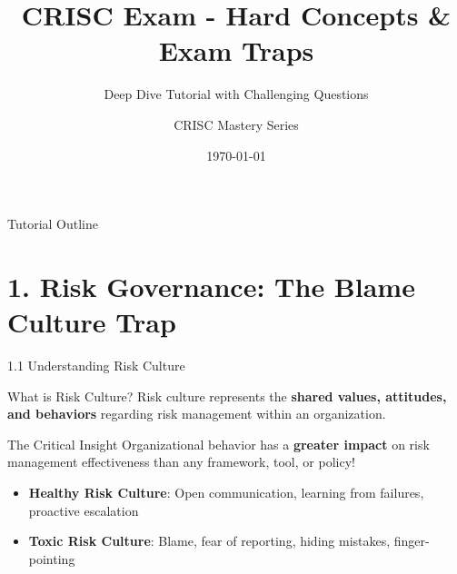 \documentclass{beamer}
\title{CRISC Exam - Hard Concepts \& Exam Traps}
\subtitle{Deep Dive Tutorial with Challenging Questions}
\author{CRISC Mastery Series}
\date{\today}
\begin{document}
	
	\begin{frame}
		\titlepage
	\end{frame}
	
	\begin{frame}{Tutorial Outline}
		\tableofcontents
	\end{frame}
	
	\section{1. Risk Governance: The Blame Culture Trap}
	
	\begin{frame}{1.1 Understanding Risk Culture}
		\begin{block}{What is Risk Culture?}
			Risk culture represents the \textbf{shared values, attitudes, and behaviors} regarding risk management within an organization.
		\end{block}
		
		\begin{alertblock}{The Critical Insight}
			Organizational behavior has a \textbf{greater impact} on risk management effectiveness than any framework, tool, or policy!
		\end{alertblock}
		
		\begin{itemize}
			\item \textbf{Healthy Risk Culture}: Open communication, learning from failures, proactive escalation
			\item \textbf{Toxic Risk Culture}: Blame, fear of reporting, hiding mistakes, finger-pointing
		\end{itemize}
	\end{frame}
	
\end{document}
